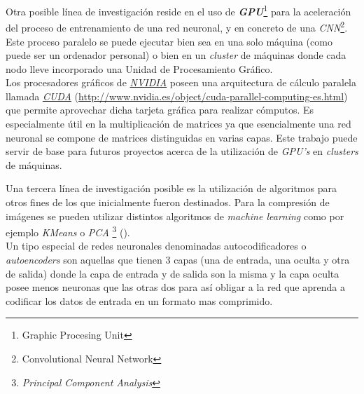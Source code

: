 Otra posible línea de investigación reside en el uso de \textbf{\textit{GPU}}\footnote{Graphic Procesing 
Unit} para la aceleración del proceso de entrenamiento de una red neuronal, y en concreto 
de una \textit{CNN}\footnote{Convolutional Neural Network}. 
Este proceso paralelo se puede ejecutar bien sea en una solo máquina (como puede ser un ordenador personal) 
o bien en un \textit{cluster} de máquinas donde cada nodo lleve incorporado una Unidad de Procesamiento Gráfico. \\
Los procesadores gráficos de \href{http://www.nvidia.es/page/home.html}{\textit{NVIDIA}} poseen una 
arquitectura de cálculo paralela llamada \href{http://www.nvidia.es/object/cuda-parallel-computing-es.html}{\textit{CUDA}}
(\url{http://www.nvidia.es/object/cuda-parallel-computing-es.html})
 que permite aprovechar dicha tarjeta gráfica para realizar cómputos. Es especialmente útil en la multiplicación 
de matrices ya que esencialmente una red neuronal se compone de matrices distinguidas en varias capas.
Este trabajo puede servir de base para futuros proyectos acerca de la utilización de \textit{GPU's} en 
\textit{clusters} de máquinas.
\newline

Una tercera línea de investigación posible es la utilización de algoritmos para otros fines de los que
inicialmente fueron destinados. Para la compresión de imágenes se pueden utilizar distintos algoritmos de
\textit{machine learning} como por ejemplo \textit{KMeans} o \textit{PCA}
\footnote{\textit{Principal Component Analysis}} (\cite{DBLP:books/lib/HastieTF09}).\\
Un tipo especial de redes neuronales denominadas autocodificadores o \textit{autoencoders} son aquellas que
tienen 3 capas (una de entrada, una oculta y otra de salida) donde la capa de entrada y de salida son la misma
y la capa oculta posee menos neuronas que las otras dos para así obligar a la red que aprenda a codificar los
datos de entrada en un formato mas comprimido.


\clearpage

